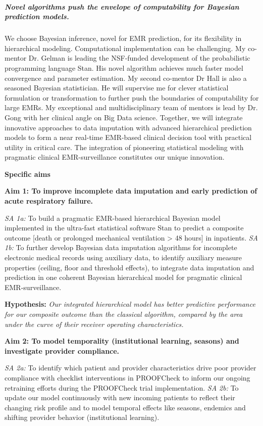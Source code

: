 \documentclass[11pt,notitlepage]{article}
\begin{document}
\subparagraph{Novel algorithms push the envelope of computability for Bayesian prediction models.} We choose Bayesian inference, novel for EMR prediction, for its flexibility in hierarchical modeling. Computational implementation can be challenging. My co-mentor Dr. Gelman is leading the NSF-funded development of the probabilistic programming language Stan. His novel algorithm achieves much faster model convergence and parameter estimation. My second co-mentor Dr Hall is also a seasoned Bayesian statistician. He will supervise me for clever statistical formulation or transformation to further push the boundaries of computability for large EMRs. My exceptional and multidisciplinary team of mentors is lead by Dr. Gong with her clinical angle on Big Data science. Together, we will integrate innovative approaches to data imputation with advanced hierarchical prediction models to form a near real-time EMR-based clinical decision tool with practical utility in critical care.  The integration of pioneering statistical modeling with pragmatic clinical EMR-surveillance constitutes our unique innovation.

\vspace{5pt}
\textbf{Specific aims}
\begin{flushleft}
\textbf{Aim 1: To improve incomplete data imputation and early prediction of acute respiratory failure.}
\end{flushleft}
\vspace{-2pt}
\textit{SA 1a:} To build a pragmatic EMR-based hierarchical Bayesian model implemented in the ultra-fast statistical software Stan to predict a composite outcome [death or prolonged mechanical ventilation > 48 hours] in inpatients.
\textit{SA 1b:} To further develop Bayesian data imputation algorithms for incomplete electronic medical records using auxiliary data, to identify auxiliary measure properties (ceiling, floor and threshold effects), to integrate data imputation and prediction in one coherent Bayesian hierarchical model for pragmatic clinical EMR-surveillance.

\begin{flushleft}
\textbf{Hypothesis:} \textit{Our integrated hierarchical model has better predictive performance for our composite outcome than the classical algorithm, compared by the area under the curve of their receiver operating characteristics.}
\end{flushleft}
\vspace{-10pt}

\begin{flushleft}
\textbf{Aim 2: To model temporality (institutional learning, seasons) and investigate provider compliance.}
\end{flushleft}
\vspace{-5pt}
\textit{SA 2a:} To identify which patient and provider characteristics drive poor provider compliance with checklist interventions in PROOFCheck to inform our ongoing retraining efforts during the PROOFCheck trial implementation. \newline
\textit{SA 2b:} To update our model continuously with new incoming patients to reflect their changing risk profile and to model temporal effects like seasons, endemics and shifting provider behavior (institutional learning). 

\end{document}
